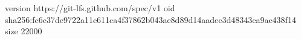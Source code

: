 version https://git-lfs.github.com/spec/v1
oid sha256:fc6c37de9722a11e611ca4f37862b043ae8d89d14aadec3d48343ca9ae438f14
size 22000
